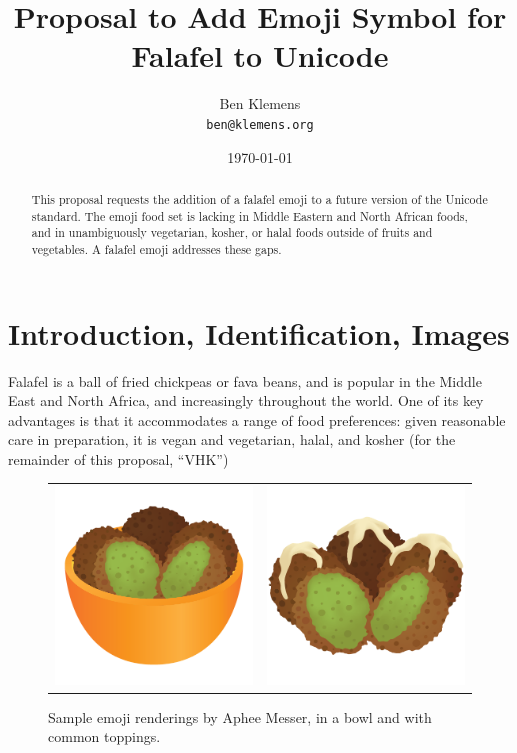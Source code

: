 \documentclass[a4paper,10pt]{article}
\begin{document}




\title{Proposal to Add Emoji Symbol for {\sc Falafel} to Unicode}
\author{Ben Klemens\\ {\tt ben@klemens.org}}
\date{\today}
\maketitle

\begin{abstract}
This proposal requests the addition of a {\sc falafel} emoji to a future version of the
Unicode standard.  The emoji food set is lacking in Middle Eastern and North African
foods, and in unambiguously vegetarian, kosher, or halal foods outside of fruits and
vegetables. A falafel emoji addresses these gaps.
\end{abstract}


\section{Introduction, Identification, Images}

{\sc Falafel} is a ball of fried chickpeas or fava beans, and is popular in the Middle East
and North Africa, and increasingly throughout the world.  One of its key advantages is
that it accommodates a range of food preferences: given reasonable care in preparation,
it is vegan and vegetarian, halal, and kosher (for the remainder of this proposal, ``VHK'')

\begin{figure}[h]
\begin{center}
\begin{tabular}{cc}
\includegraphics[width=2.2in]{falafel-bowl.png}& \includegraphics[width=2.2in]{falafel-tahini.png}
\end{tabular}
\end{center}
\caption{Sample emoji renderings by Aphee Messer, in a bowl and with common toppings.}
\label{apheefig}
\end{figure}
\end{document}

